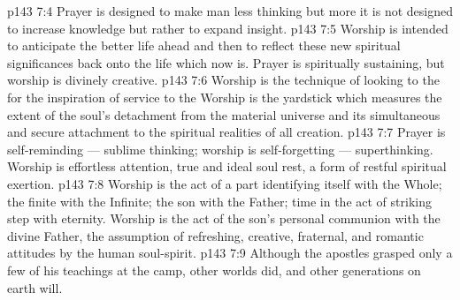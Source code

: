\vs p143 7:4 \pc Prayer is designed to make man less thinking but more  it is not designed to increase knowledge but rather to expand insight.
\vs p143 7:5 \pc Worship is intended to anticipate the better life ahead and then to reflect these new spiritual significances back onto the life which now is. Prayer is spiritually sustaining, but worship is divinely creative.
\vs p143 7:6 \pc Worship is the technique of looking to the  for the inspiration of service to the  Worship is the yardstick which measures the extent of the soul’s detachment from the material universe and its simultaneous and secure attachment to the spiritual realities of all creation.
\vs p143 7:7 \pc Prayer is self\hyp{}reminding --- sublime thinking; worship is self\hyp{}forgetting --- superthinking. Worship is effortless attention, true and ideal soul rest, a form of restful spiritual exertion.
\vs p143 7:8 \pc Worship is the act of a part identifying itself with the Whole; the finite with the Infinite; the son with the Father; time in the act of striking step with eternity. Worship is the act of the son’s personal communion with the divine Father, the assumption of refreshing, creative, fraternal, and romantic attitudes by the human soul\hyp{}spirit.
\vs p143 7:9 \pc Although the apostles grasped only a few of his teachings at the camp, other worlds did, and other generations on earth will.
\quizlink
